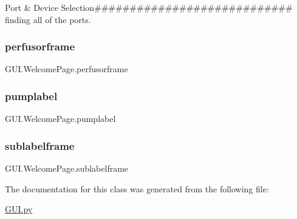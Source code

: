 Port \& Device Selection\#\#\#\#\#\#\#\#\#\#\#\#\#\#\#\#\#\#\#\#\#\#\#\#\#\#\#\# finding all of the ports. 

\mbox{\label{class_g_u_i_1_1_welcome_page_a9228925baaa2dce27b3c403f6dc989fb}} 
\subsubsection{\texorpdfstring{perfusorframe}{perfusorframe}}
{\footnotesize\ttfamily G\+U\+I.\+Welcome\+Page.\+perfusorframe}

\mbox{\label{class_g_u_i_1_1_welcome_page_a1760f2af3848183bb73cfec74b78f27c}} 
\subsubsection{\texorpdfstring{pumplabel}{pumplabel}}
{\footnotesize\ttfamily G\+U\+I.\+Welcome\+Page.\+pumplabel}

\mbox{\label{class_g_u_i_1_1_welcome_page_a82599f77f38933702392daab0cf6a396}} 
\subsubsection{\texorpdfstring{sublabelframe}{sublabelframe}}
{\footnotesize\ttfamily G\+U\+I.\+Welcome\+Page.\+sublabelframe}



The documentation for this class was generated from the following file\+:\begin{DoxyCompactItemize}
\item 
\mbox{\hyperlink{_g_u_i_8py}{G\+U\+I.\+py}}\end{DoxyCompactItemize}
